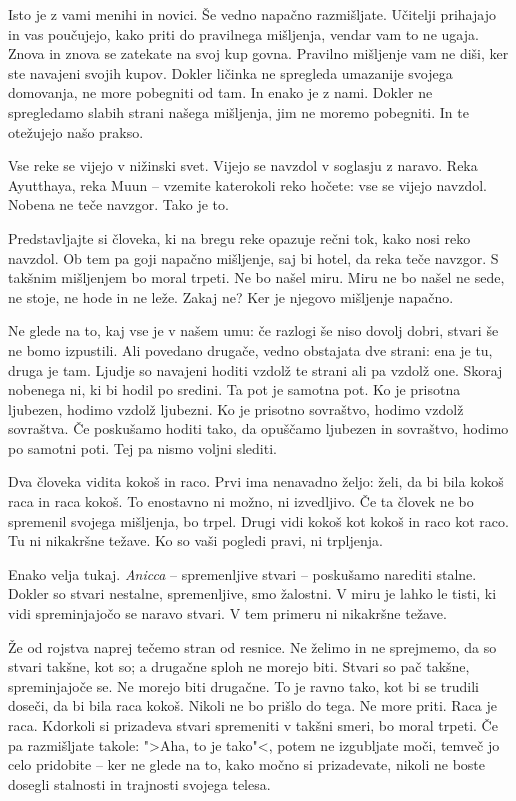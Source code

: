 Isto je z vami menihi in novici. Še vedno napačno razmišljate. Učitelji prihajajo in vas poučujejo, kako priti do pravilnega mišljenja, vendar vam to ne ugaja. Znova in znova se zatekate na svoj kup govna. Pravilno mišljenje vam ne diši, ker ste navajeni svojih kupov. Dokler ličinka ne spregleda umazanije svojega domovanja, ne more pobegniti od tam. In enako je z nami. Dokler ne spregledamo slabih strani našega mišljenja, jim ne moremo pobegniti. In te otežujejo našo prakso.

\clearpage


Vse reke se vijejo v nižinski svet. Vijejo se navzdol v soglasju z naravo. Reka Ayutthaya, reka Muun – vzemite katerokoli reko hočete: vse se vijejo navzdol. Nobena ne teče navzgor. Tako je to.

Predstavljajte si človeka, ki na bregu reke opazuje rečni tok, kako nosi reko navzdol. Ob tem pa goji napačno mišljenje, saj bi hotel, da reka teče navzgor. S takšnim mišljenjem bo moral trpeti. Ne bo našel miru. Miru ne bo našel ne sede, ne stoje, ne hode in ne leže. Zakaj ne? Ker je njegovo mišljenje napačno.


Ne glede na to, kaj vse je v našem umu: če razlogi še niso dovolj dobri, stvari še ne bomo izpustili. Ali povedano drugače, vedno obstajata dve strani: ena je tu, druga je tam. Ljudje so navajeni hoditi vzdolž te strani ali pa vzdolž one. Skoraj nobenega ni, ki bi hodil po sredini. Ta pot je samotna pot. Ko je prisotna ljubezen, hodimo vzdolž ljubezni. Ko je prisotno sovraštvo, hodimo vzdolž sovraštva. Če poskušamo hoditi tako, da opuščamo ljubezen in sovraštvo, hodimo po samotni poti. Tej pa nismo voljni slediti.

\clearpage


Dva človeka vidita kokoš in raco. Prvi ima nenavadno željo: želi, da bi bila kokoš raca in raca kokoš. To enostavno ni možno, ni izvedljivo. Če ta človek ne bo spremenil svojega mišljenja, bo trpel. Drugi vidi kokoš kot kokoš in raco kot raco. Tu ni nikakršne težave. Ko so vaši pogledi pravi, ni trpljenja.

Enako velja tukaj. \emph{Anicca} – spremenljive stvari – poskušamo narediti stalne. Dokler so stvari nestalne, spremenljive, smo žalostni. V miru je lahko le tisti, ki vidi spreminjajočo se naravo stvari. V tem primeru ni nikakršne težave.

Že od rojstva naprej tečemo stran od resnice. Ne želimo in ne sprejmemo, da so stvari takšne, kot so; a drugačne sploh ne morejo biti. Stvari so pač takšne, spreminjajoče se. Ne morejo biti drugačne. To je ravno tako, kot bi se trudili doseči, da bi bila raca kokoš. Nikoli ne bo prišlo do tega. Ne more priti. Raca je raca. Kdorkoli si prizadeva stvari spremeniti v takšni smeri, bo moral trpeti. Če pa razmišljate takole: ">Aha, to je tako"<, potem ne izgubljate moči, temveč jo celo pridobite – ker ne glede na to, kako močno si prizadevate, nikoli ne boste dosegli stalnosti in trajnosti svojega telesa.


